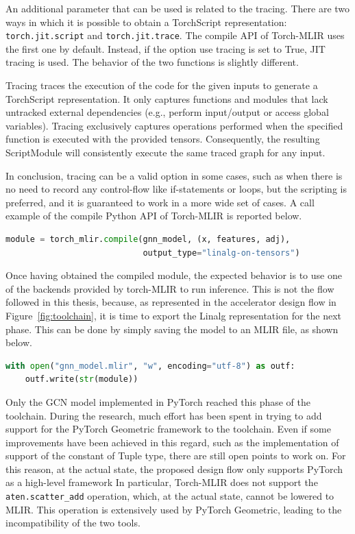 An additional parameter that can be used is related to the tracing.
There are two ways in which it is possible to obtain a TorchScript representation: \lstinline{torch.jit.script} and \lstinline{torch.jit.trace}.
The compile API of Torch-MLIR uses the first one by default.
Instead, if the option use tracing is set to True, JIT tracing is used.
The behavior of the two functions is slightly different.

Tracing traces the execution of the code for the given inputs to generate a TorchScript representation.
It only captures functions and modules that lack untracked external dependencies (e.g., perform input/output or access global variables).
Tracing exclusively captures operations performed when the specified function is executed with the provided tensors.
Consequently, the resulting ScriptModule will consistently execute the same traced graph for any input.

In conclusion, tracing can be a valid option in some cases, such as when there is no need to record any control-flow like if-statements or loops, but the scripting is preferred, and it is guaranteed to work in a more wide set of cases.
A call example of the compile Python API of Torch-MLIR is reported below.
\begin{lstlisting}[language=Python,label={lst:torch_mlir-compile}]
module = torch_mlir.compile(gnn_model, (x, features, adj),
                            output_type="linalg-on-tensors")
\end{lstlisting}

Once having obtained the compiled module, the expected behavior is to use one of the backends provided by torch-MLIR to run inference.
This is not the flow followed in this thesis, because, as represented in the accelerator design flow in Figure~\ref{fig:toolchain}, it is time to export the Linalg representation for the next phase.
This can be done by simply saving the model to an MLIR file, as shown below.
\begin{lstlisting}[language=Python,label={lst:torch_mlir-export}]
with open("gnn_model.mlir", "w", encoding="utf-8") as outf:
    outf.write(str(module))
\end{lstlisting}

Only the GCN model implemented in PyTorch reached this phase of the toolchain.
During the research, much effort has been spent in trying to add support for the PyTorch Geometric framework to the toolchain.
Even if some improvements have been achieved in this regard, such as the implementation of support of the constant of Tuple type, there are still open points to work on.
For this reason, at the actual state, the proposed design flow only supports PyTorch as a high-level framework
In particular, Torch-MLIR does not support the \lstinline{aten.scatter_add} operation, which, at the actual state, cannot be lowered to MLIR\@.
This operation is extensively used by PyTorch Geometric, leading to the incompatibility of the two tools.

